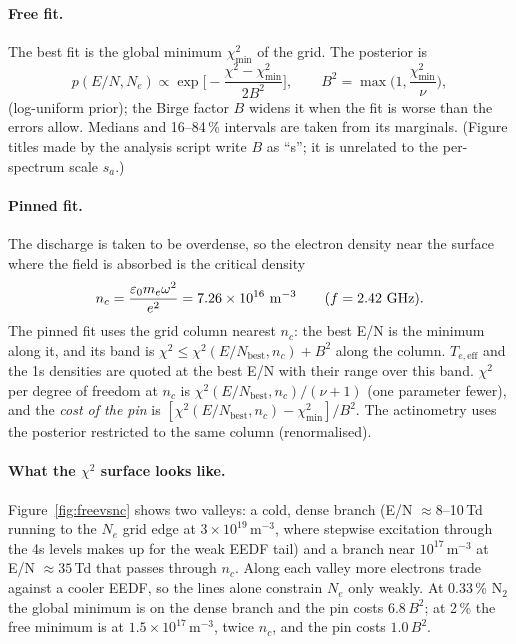 \documentclass[11pt]{article}
\newcommand{\EN}{E/N}
\newcommand{\Teff}{T_{e,\mathrm{eff}}}
\newcommand{\nc}{n_c}
\begin{document}
\paragraph{Free fit.} The best fit is the global minimum $\chi^2_{\min}$ of the grid. The posterior is
\begin{equation}
p(\EN, N_e) \propto \exp\!\Big[-\frac{\chi^2 - \chi^2_{\min}}{2B^2}\Big],\qquad
B^2 = \max\!\Big(1, \frac{\chi^2_{\min}}{\nu}\Big),
\end{equation}
(log-uniform prior); the Birge factor $B$ widens it when the fit is worse than the errors allow. Medians and
16--84\,\% intervals are taken from its marginals. (Figure titles made by the analysis script write $B$ as ``s'';
it is unrelated to the per-spectrum scale $s_a$.)

\paragraph{Pinned fit.} The discharge is taken to be overdense, so the electron density near the surface where the
field is absorbed is the critical density
\begin{equation}
\nc = \frac{\varepsilon_0 m_e \omega^2}{e^2} = \Nc\ \mathrm{m}^{-3}\qquad (f = 2.42\ \mathrm{GHz}).
\end{equation}
The pinned fit uses the grid column nearest $\nc$: the best \EN{} is the minimum along it, and its band is
$\chi^2 \le \chi^2(\EN_{\mathrm{best}},\nc) + B^2$ along the column. $\Teff$ and the 1s densities are quoted at the
best \EN{} with their range over this band. $\chi^2$ per degree of freedom at $\nc$ is
$\chi^2(\EN_{\mathrm{best}},\nc)/(\nu+1)$ (one parameter fewer), and the \emph{cost of the pin} is
$[\chi^2(\EN_{\mathrm{best}},\nc)-\chi^2_{\min}]/B^2$. The actinometry uses the posterior restricted to the same
column (renormalised).

\paragraph{What the $\chi^2$ surface looks like.} Figure~\ref{fig:freevsnc} shows two valleys: a cold, dense
branch (\EN{} $\approx 8$--10\,Td running to the $N_e$ grid edge at $3\times10^{19}$\,m$^{-3}$, where stepwise
excitation through the 4s levels makes up for the weak EEDF tail) and a branch near $10^{17}$\,m$^{-3}$ at
\EN{} $\approx 35$\,Td that passes through $\nc$. Along each valley more electrons trade against a cooler EEDF, so
the lines alone constrain $N_e$ only weakly. At 0.33\,\% N$_2$ the global minimum is on the dense branch and the pin
costs $6.8\,B^2$; at 2\,\% the free minimum is at $1.5\times10^{17}$\,m$^{-3}$, twice $\nc$, and the pin costs
$1.0\,B^2$.
\end{document}
